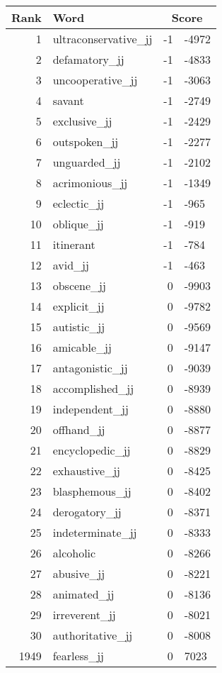 \begin{longtable}[!htbp]{| rlr@{.}l |}
    \hline
    \textbf{Rank} & \textbf{Word} & \multicolumn{2}{c|}{\textbf{Score}} \\
    \hline
    \endhead
    1 & ultraconservative\_jj & -1 & -4972 \\
    2 & defamatory\_jj & -1 & -4833 \\
    3 & uncooperative\_jj & -1 & -3063 \\
    4 & savant & -1 & -2749 \\
    5 & exclusive\_jj & -1 & -2429 \\
    6 & outspoken\_jj & -1 & -2277 \\
    7 & unguarded\_jj & -1 & -2102 \\
    8 & acrimonious\_jj & -1 & -1349 \\
    9 & eclectic\_jj & -1 & -965 \\
    10 & oblique\_jj & -1 & -919 \\
    11 & itinerant & -1 & -784 \\
    12 & avid\_jj & -1 & -463 \\
    13 & obscene\_jj & 0 & -9903 \\
    14 & explicit\_jj & 0 & -9782 \\
    15 & autistic\_jj & 0 & -9569 \\
    16 & amicable\_jj & 0 & -9147 \\
    17 & antagonistic\_jj & 0 & -9039 \\
    18 & accomplished\_jj & 0 & -8939 \\
    19 & independent\_jj & 0 & -8880 \\
    20 & offhand\_jj & 0 & -8877 \\
    21 & encyclopedic\_jj & 0 & -8829 \\
    22 & exhaustive\_jj & 0 & -8425 \\
    23 & blasphemous\_jj & 0 & -8402 \\
    24 & derogatory\_jj & 0 & -8371 \\
    25 & indeterminate\_jj & 0 & -8333 \\
    26 & alcoholic & 0 & -8266 \\
    27 & abusive\_jj & 0 & -8221 \\
    28 & animated\_jj & 0 & -8136 \\
    29 & irreverent\_jj & 0 & -8021 \\
    30 & authoritative\_jj & 0 & -8008 \\
    1949 & fearless\_jj & 0 & 7023 \\

\end{longtable}
